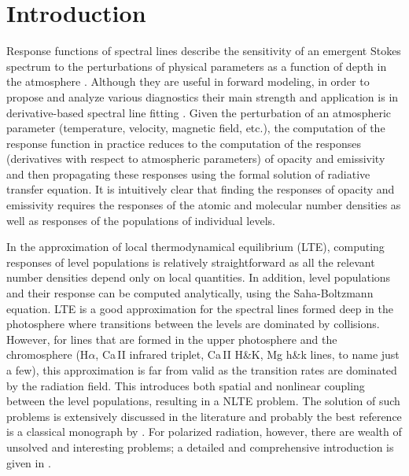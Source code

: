\documentclass[referee]{aa}
\begin{document}

   \maketitle


\section{Introduction}

Response functions of spectral lines \citep{Mein71, Beckers75, Landi77} describe the sensitivity of an emergent Stokes spectrum to the perturbations of physical parameters as a function of depth in the atmosphere \citep[for a detailed study of the possible diagnostics see][]{RFs94}. Although they are useful in forward modeling, in order to propose and analyze various diagnostics \citep[e.g.,][]{Han06}  their main strength and application is in derivative-based spectral line fitting \citep[in solar physics widely known as ``inversion''; see, e.g.,][]{SIR}. Given the perturbation of an atmospheric parameter (temperature, velocity, magnetic field, etc.), the computation of the response function in practice reduces to the computation of the responses (derivatives with respect to atmospheric parameters) of opacity and emissivity and then propagating these responses using the formal solution of radiative transfer equation. It is intuitively clear that finding the responses of opacity and emissivity requires the responses of the atomic and molecular number densities as well as responses of the populations of individual levels. 

In the approximation of local thermodynamical equilibrium (LTE), computing responses of level populations is relatively straightforward \citep[e.g.,][]{SIR, dtibook}  as all the relevant number densities depend only on local quantities. In addition, level populations and their response can be computed analytically, using the Saha-Boltzmann equation. LTE is a good approximation for the spectral lines formed deep in the photosphere where transitions between the levels are dominated by collisions. However, for lines that are formed in the upper photosphere and the chromosphere (H$\alpha$, Ca\,II infrared triplet, Ca\,II H\&K, Mg h\&k lines, to name just a few), this approximation is far from valid as the transition rates are dominated by the radiation field. This introduces both spatial and nonlinear coupling between the level populations, resulting in a  NLTE problem. The solution of such problems is extensively discussed in the literature and probably the best reference is a classical monograph by \citet{Mihalasbook} \citep[or a recent re-issue by][]{SAbook2014}. For polarized radiation, however, there are wealth of unsolved and interesting problems; a detailed and comprehensive introduction is given in \citet{LL04}.
\end{document}
